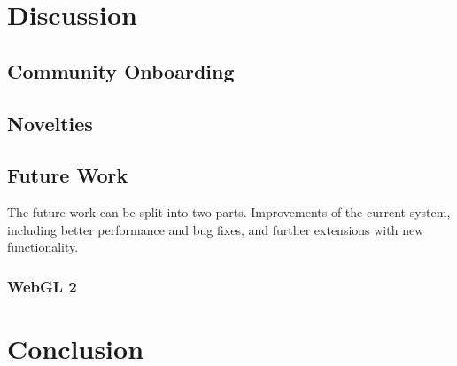 \section{Discussion}
\subsection{Community Onboarding}

\subsection{Novelties}

\subsection{Future Work}
The future work can be split into two parts. Improvements of the current system,
including better performance and bug fixes, and further extensions with new functionality.

\subsubsection{WebGL 2}\label{sec_futureGL}


\section{Conclusion}

